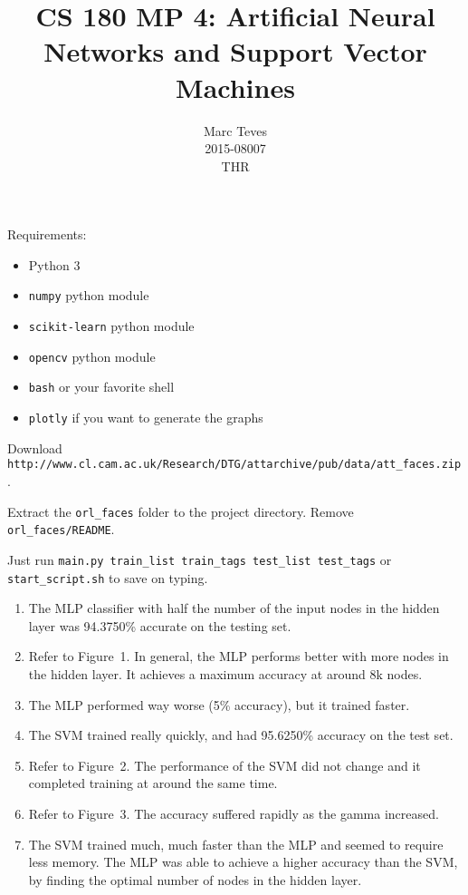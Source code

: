 \documentclass{article}
\begin{document}
	\title{CS 180 MP 4: Artificial Neural Networks and Support Vector Machines}
	\author{Marc Teves\\ 2015-08007\\ THR}
	\maketitle

	Requirements:
	\begin{itemize}
		\item Python 3
		\item \texttt{numpy} python module
		\item \texttt{scikit-learn} python module
		\item \texttt{opencv} python module
		\item \texttt{bash} or your favorite shell
		\item \texttt{plotly} if you want to generate the graphs
	\end{itemize}

	Download \texttt{http://www.cl.cam.ac.uk/Research/DTG/attarchive/pub/data/att\_faces.zip}.

	Extract the \texttt{orl\_faces} folder to the project directory. Remove 
	\texttt{orl\_faces/README}. 

	Just run \texttt{main.py train\_list train\_tags test\_list test\_tags} or
	\texttt{start\_script.sh} to save on typing.

	\begin{enumerate}
		\item 
			The MLP classifier with half the number of the input nodes in the hidden layer was 94.3750\% accurate on the testing set.
		\item 
			Refer to Figure~1.
			In general, the MLP performs better with more nodes in the hidden layer.
			It achieves a maximum accuracy at around 8k nodes.
		\item 
			The MLP performed way worse (5\% accuracy), but it trained faster.
		\item
			The SVM trained really quickly, and had 95.6250\% accuracy on the test set.
		\item 
			Refer to Figure~2.
			The performance of the SVM did not change and it completed training at around the same time.
		\item
			Refer to Figure~3.
			The accuracy suffered rapidly as the gamma increased.
		\item
			The SVM trained much, much faster than the MLP and seemed to require less memory.
			The MLP was able to achieve a higher accuracy than the SVM, by finding the optimal number of nodes in the hidden layer.
	\end{enumerate}
\end{document}
